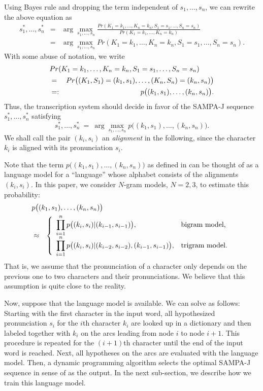 Using Bayes rule and dropping the term independent of
$s_1,\ldots,s_n$, we can rewrite the above equation as
\begin{eqnarray*}
s_1^\ast,\ldots,s_n^\ast & = & \arg\max_{s_1,\ldots,s_n}
\frac{Pr(K_1=k_1,\ldots,K_n=k_n,S_1=s_1,\dots,S_n=s_n)}
{Pr(K_1=k_1,\ldots,K_n=k_n)} \\
& = & \arg\max_{s_1,\ldots,s_n}
Pr(K_1=k_1,\ldots,K_n=k_n,S_1=s_1,\dots,S_n=s_n).
\end{eqnarray*}
With some abuse of notation, we write
\begin{eqnarray}
\lefteqn{Pr(K_1=k_1,\ldots,K_n=k_n,S_1=s_1,\dots,S_n=s_n)} \nonumber \\
& = &
Pr\big((K_1,S_1)=(k_1,s_1),\ldots,(K_n,S_n)=(k_n,s_n)\big) \nonumber \\
& =: & p\big((k_1,s_1),\dots,(k_n,s_n)\big). \label{lm_definition}
\end{eqnarray}
Thus, the transcription system should decide in favor of the
SAMPA-J sequence $s_1^\ast,\ldots,s_n^\ast$ satisfying
\begin{equation}
s_1^\ast,\ldots,s_n^\ast \ = \ \arg\max_{s_1,\ldots,s_n}
p\big((k_1,s_1),\dots,(k_n,s_n)\big). \label{max_problem}
\end{equation}
We shall call the pair $(k_i,s_i)$ an {\it alignment}\/ in the
following, since the character $k_i$ is aligned with its
pronunciation $s_i$.

Note that the term $p\big((k_1,s_1),\dots,(k_n,s_n)\big)$ as
defined in  can be thought of as a language
model for a ``language'' whose alphabet consists of the alignments
$(k_i,s_i)$. In this paper, we consider $N$-gram models, $N=2, 3$,
to estimate this probability:
\begin{eqnarray*}
\lefteqn{p\big((k_1,s_1),\dots,(k_n,s_n)\big)} \\
& \approx & \left\{ \begin{array}{ll} \displaystyle\prod_{i=1}^n
p\big((k_i,s_i)|(k_{i-1}, s_{i-1})\big),
& \mbox{bigram model,} \\
\displaystyle\prod_{i=1}^n p\big((k_i,s_i)|(k_{i-2}, s_{i-2}),
(k_{i-1}, s_{i-1})\big), & \mbox{trigram model.}
\end{array} \right.
\end{eqnarray*}
That is, we assume that the pronunciation of a character only
depends on the previous one to two characters and their
pronunciations. We believe that this assumption is quite close to
the reality.

Now, suppose that the language model is available. We can solve
 as follows: Starting with the first character in
the input word, all hypothesized pronunciation $s_i$ for the $i$th
character $k_i$ are looked up in a dictionary and then labeled
together with $k_i$ on the arcs leading from node $i$ to node
$i+1$. This procedure is repeated for the $(i+1)$th character
until the end of the input word is reached. Next, all hypotheses
on the arcs are evaluated with the language model. Then, a dynamic
programming algorithm selects the optimal SAMPA-J sequence in
sense of  as the output. In the next sub-section,
we describe how we train this language model.

